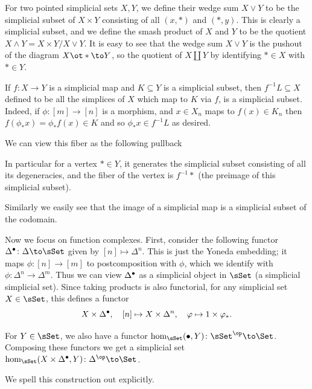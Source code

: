 For two pointed simplicial sets $X,Y$, we define their {\emphcolor wedge sum} $X\vee Y$ to be the simplicial subset of $X\times Y$
consisting of all $(x,*)$ and $(*,y)$.
This is clearly a simplicial subset, and we define the {\emphcolor smash product} of $X$ and $Y$ to be the quotient $X\wedge Y=X\times Y/X\vee Y$.
It is easy to see that the wedge sum $X\vee Y$ is the pushout of the diagram $X\ot*\to Y$, so the quotient of $X\amalg Y$ by identifying $*\in X$ with $*\in Y$.

If $f\colon X\to Y$ is a simplicial map and $K\subseteq Y$ is a simplicial subset, then $f^{-1}L\subseteq X$ defined to be
all the simplices of $X$ which map to $K$ via $f$, is a simplicial subset.
Indeed, if $\phi\colon[m]\to[n]$ is a morphism, and $x\in X_n$ maps to $f(x)\in K_n$ then $f(\phi_*x)=\phi_*f(x)\in K$ and so
$\phi_*x\in f^{-1}L$ as desired.

We can view this fiber as the following pullback

\centerline{}

In particular for a vertex $*\in Y$, it generates the simplicial subset consisting of all its degeneracies, and the fiber of
the vertex is $f^{-1}*$ (the preimage of this simplicial subset).

Similarly we easily see that the image of a simplicial map is a simplicial subset of the codomain.

Now we focus on function complexes.
First, consider the following functor $\Delta^\bul\colon\Delta\to\sSet$ given by $[n]\mapsto\Delta^n$.
This is just the Yoneda embedding; it maps $\phi\colon[n]\to[m]$ to postcomposition with $\phi$, which we identify with
$\phi\colon\Delta^n\to\Delta^m$.
Thus we can view $\Delta^\bullet$ as a simplicial object in $\sSet$ (a simplicial simplicial set).
Since taking products is also functorial, for any simplicial set $X\in\sSet$, this defines a functor
$$ X\times\Delta^\bullet,\quad [n]\mapsto X\times\Delta^n,\quad \varphi\mapsto1\times\varphi_* . $$

For $Y\in\sSet$, we also have a functor $\hom_\sSet(\bul,Y)\colon\sSet^\op\to\Set$.
Composing these functors we get a simplicial set $\hom_\sSet(X\times\Delta^\bul,Y)\colon\Delta^\op\to\Set$.

We spell this construction out explicitly.

